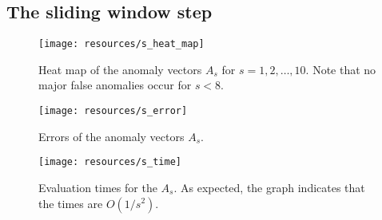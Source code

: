 \subsection{The sliding window step}
\FloatBarrier{}
\label{sect:s}

\begin{figure}[h]
    \vspace{-15pt}
    \begin{center}
        \texttt{[image: resources/s\_heat\_map]}
    \end{center}
    \vspace{-20pt}
    \caption{\small{Heat map of the anomaly vectors $A_s$ for $s = 1,2,\dots,10$. Note that no major false anomalies occur for $s < 8$.}}
    \vspace{-10pt}
\label{fig:s_heat_map}
\end{figure}


\begin{figure}[h]
    \begin{minipage}{0.5\textwidth}
        \centering
        \texttt{[image: resources/s\_error]}
        \caption{\small{Errors of the anomaly vectors $A_s$.\\ \quad}}
\label{fig:s_error}
    \end{minipage}%
    \begin{minipage}{0.5\textwidth}
        \centering
        \texttt{[image: resources/s\_time]}
        \caption{\small{Evaluation times for the $A_s$. As expected, the graph indicates that the times are $O(1/s^2)$.}}
\label{fig:s_time}
    \end{minipage}%
\end{figure}%


